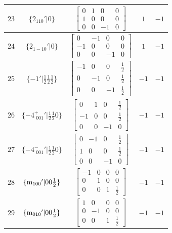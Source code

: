 \documentclass[fleqn,8pt]{jsarticle}
\begin{document}
\begin{longtable}{ccccc}
$ 23 $ & $ \{2{}_{110}{}'|0\} $ & $ \begin{bmatrix} 0 & 1 & 0 & 0 \\ 1 & 0 & 0 & 0 \\ 0 & 0 & -1 & 0 \end{bmatrix} $ & $ 1 $ & $ -1 $ \\ \hline
$ 24 $ & $ \{2{}_{1-10}{}'|0\} $ & $ \begin{bmatrix} 0 & -1 & 0 & 0 \\ -1 & 0 & 0 & 0 \\ 0 & 0 & -1 & 0 \end{bmatrix} $ & $ 1 $ & $ -1 $ \\ \hline
$ 25 $ & $ \{-1{}'|\frac{1}{2} \frac{1}{2} \frac{1}{2}\} $ & $ \begin{bmatrix} -1 & 0 & 0 & \frac{1}{2} \\ 0 & -1 & 0 & \frac{1}{2} \\ 0 & 0 & -1 & \frac{1}{2} \end{bmatrix} $ & $ -1 $ & $ -1 $ \\ \hline
$ 26 $ & $ \{-4^{+}_{\,\,001}{}'|\frac{1}{2} \frac{1}{2} 0\} $ & $ \begin{bmatrix} 0 & 1 & 0 & \frac{1}{2} \\ -1 & 0 & 0 & \frac{1}{2} \\ 0 & 0 & -1 & 0 \end{bmatrix} $ & $ -1 $ & $ -1 $ \\ \hline
$ 27 $ & $ \{-4^{-}_{\,\,001}{}'|\frac{1}{2} \frac{1}{2} 0\} $ & $ \begin{bmatrix} 0 & -1 & 0 & \frac{1}{2} \\ 1 & 0 & 0 & \frac{1}{2} \\ 0 & 0 & -1 & 0 \end{bmatrix} $ & $ -1 $ & $ -1 $ \\ \hline
$ 28 $ & $ \{{\rm m}_{100}{}'|0 0 \frac{1}{2}\} $ & $ \begin{bmatrix} -1 & 0 & 0 & 0 \\ 0 & 1 & 0 & 0 \\ 0 & 0 & 1 & \frac{1}{2} \end{bmatrix} $ & $ -1 $ & $ -1 $ \\ \hline
$ 29 $ & $ \{{\rm m}_{010}{}'|0 0 \frac{1}{2}\} $ & $ \begin{bmatrix} 1 & 0 & 0 & 0 \\ 0 & -1 & 0 & 0 \\ 0 & 0 & 1 & \frac{1}{2} \end{bmatrix} $ & $ -1 $ & $ -1 $ \\ \hline

\end{longtable}
\end{document}
